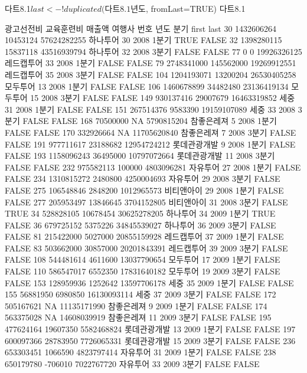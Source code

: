 \begin{Schunk}
\begin{Soutput}
다트8.1$last <- !duplicated(다트8.1$년도, fromLast=TRUE)
다트8.1

    광고선전비 교육훈련비      매출액       여행사 번호 년도  분기 first  last
30  1432606264   10453124 57624282255     하나투어   30 2008 1분기  TRUE FALSE
32  1398280115   15837118 43516939794     하나투어   32 2008 3분기 FALSE FALSE
77           0          0 19926326125   레드캡투어   33 2008 1분기 FALSE FALSE
79  2748341000  145562000 19269912551   레드캡투어   35 2008 3분기 FALSE FALSE
104 1204193071   13200204 26530405258     모두투어   13 2008 1분기 FALSE FALSE
106 1460678899   34482480 23136419134     모두투어   15 2008 3분기 FALSE FALSE
149  930137416   29007679 16463319852         세중   31 2008 1분기 FALSE FALSE
151  267514376    9583390 19159107089         세중   33 2008 3분기 FALSE FALSE
168   70500000         NA  5790815204   참좋은레져    5 2008 1분기 FALSE FALSE
170  332926664         NA 11705620840   참좋은레져    7 2008 3분기 FALSE FALSE
191  977711617   23188682 12954724212 롯데관광개발    9 2008 1분기 FALSE FALSE
193 1158096243   36495000 10797072664 롯데관광개발   11 2008 3분기 FALSE FALSE
232  975582113     100000  4803096281     자유투어   27 2008 1분기 FALSE FALSE
234 1310815272    2480800  4250004693     자유투어   29 2008 3분기 FALSE FALSE
275  106548846    2848200  1012965573   비티앤아이   29 2008 1분기 FALSE FALSE
277  205953497   13846645  3704152805   비티앤아이   31 2008 3분기 FALSE  TRUE
34   528828105   10678454 30625278205     하나투어   34 2009 1분기  TRUE FALSE
36   679725152    5375226 34845539027     하나투어   36 2009 3분기 FALSE FALSE
81   215422000    5027000 20855159928   레드캡투어   37 2009 1분기 FALSE FALSE
83   503662000   30857000 20201843391   레드캡투어   39 2009 3분기 FALSE FALSE
108  544481614    4611600 13037790654     모두투어   17 2009 1분기 FALSE FALSE
110  586547017    6552350 17831640182     모두투어   19 2009 3분기 FALSE FALSE
153  128959936    1252642 13597706178         세중   35 2009 1분기 FALSE FALSE
155   56881950    6980850 16130093114         세중   37 2009 3분기 FALSE FALSE
172  505167621         NA 11135171990   참좋은레져    9 2009 1분기 FALSE FALSE
174  563375028         NA 14608039919   참좋은레져   11 2009 3분기 FALSE FALSE
195  477624164   19607350  5582468824 롯데관광개발   13 2009 1분기 FALSE FALSE
197  600097366   28783950  7726065331 롯데관광개발   15 2009 3분기 FALSE FALSE
236  653303451    1066590  4823797414     자유투어   31 2009 1분기 FALSE FALSE
238  650179780    -706010  7022767720     자유투어   33 2009 3분기 FALSE FALSE

\end{Soutput}
\end{Schunk}
